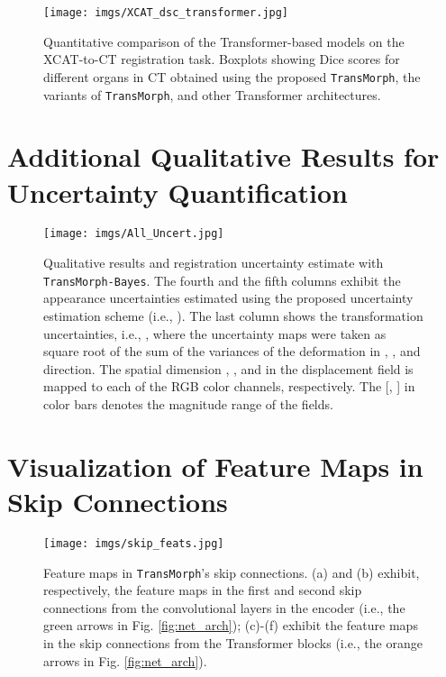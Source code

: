 \documentclass[times,twocolumn,final]{elsarticle}
\begin{document}
\begin{figure*}[!htp]
\centering
\texttt{[image: imgs/XCAT\_dsc\_transformer.jpg]}
\caption{Quantitative comparison of the Transformer-based models on the XCAT-to-CT registration task. Boxplots showing Dice scores for different organs in CT obtained using the proposed \texttt{TransMorph}, the variants of \texttt{TransMorph}, and other Transformer architectures.\label{fig:xcat_brain_transformer}}
\end{figure*}
\newpage
\section{Additional Qualitative Results for Uncertainty Quantification}
\begin{figure*}[!htp]
\centering
\texttt{[image: imgs/All\_Uncert.jpg]}
\caption{Qualitative results and registration uncertainty estimate with \texttt{TransMorph-Bayes}. The fourth and the fifth columns exhibit the appearance uncertainties estimated using the proposed uncertainty estimation scheme (i.e., ). The last column shows the transformation uncertainties, i.e., , where the uncertainty maps were taken as square root of the sum of the variances of the deformation in , ,
and  direction. The spatial dimension , , and  in the displacement field is mapped to each of the RGB color channels, respectively. The [, ] in color bars denotes the magnitude range of the fields. \label{fig:jhu_brain_uncert}}
\end{figure*}
\newpage

\section{Visualization of Feature Maps in Skip Connections}
\begin{figure*}[!htp]
\centering
\texttt{[image: imgs/skip\_feats.jpg]}
\caption{Feature maps in \texttt{TransMorph}'s skip connections. (a) and (b) exhibit, respectively, the feature maps in the first and second skip connections from the convolutional layers in the encoder (i.e., the green arrows in Fig. \ref{fig:net_arch}); (c)-(f) exhibit the feature maps in the skip connections from the Transformer blocks (i.e., the orange arrows in Fig. \ref{fig:net_arch}).\label{fig:skip_feat}}
\end{figure*}
\end{document}
